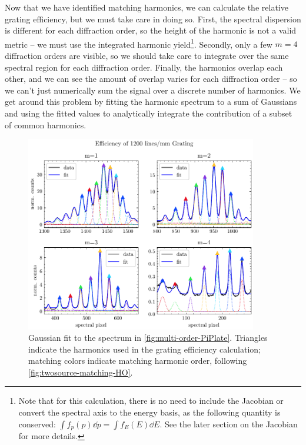 Now that we have identified matching harmonics, we can calculate the relative grating efficiency, but we must take care in doing so. First, the spectral dispersion is different for each diffraction order, so the height of the harmonic is not a valid metric -- we must use the integrated harmonic yield\footnote{Note that for this calculation, there is no need to include the Jacobian or convert the spectral axis to the energy basis, as the following quantity is conserved: $\int f_p(p) \dd{p} = \int f_E(E) \dd{E}$. See the later section on the Jacobian for more details.}. Secondly, only a few $m=4$ diffraction orders are visible, so we should take care to integrate over the same spectral region for each diffraction order. Finally, the harmonics overlap each other, and we can see the amount of overlap varies for each diffraction order -- so we can't just numerically sum the signal over a discrete number of harmonics. We get around this problem by fitting the harmonic spectrum to a sum of Gaussians and using the fitted values to analytically integrate the contribution of a subset of common harmonics.

\begin{figure}
	\centering
	\includegraphics[width=0.9\textwidth]{figures/chap2/grating-efficiency.pdf}
	\caption{Gaussian fit to the spectrum in \cref{fig:multi-order-PiPlate}. Triangles indicate the harmonics used in the grating efficiency calculation; matching colors indicate matching harmonic order, following \cref{fig:twosource-matching-HO}.}
	\label{fig:grating-efficiency}
\end{figure}

